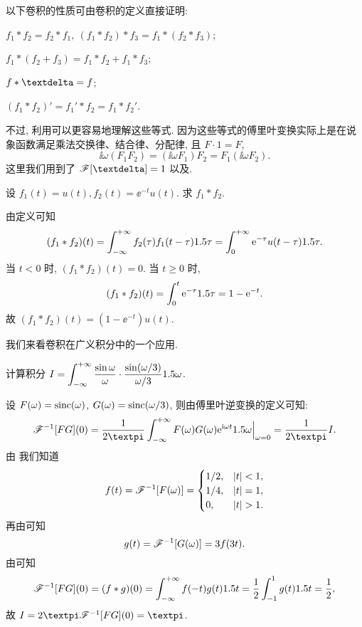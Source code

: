 以下卷积的性质可由卷积的定义直接证明:
\begin{enuma}
  \item $f_1\ast f_2=f_2\ast f_1,\ (f_1\ast f_2)\ast f_3=f_1\ast(f_2\ast f_3)$;
  \item $f_1\ast(f_2+f_3)=f_1\ast f_2+f_1\ast f_3$;
  \item $f\ast\dirac=f$;
  \item $(f_1\ast f_2)'=f_1'\ast f_2=f_1\ast f_2'$.
\end{enuma}
不过, 利用\thmFConv 可以更容易地理解这些等式.
因为这些等式的傅里叶变换实际上是在说象函数满足乘法交换律、结合律、分配律, 且 $F\cdot 1=F$,
\[
  \ii\omega (F_1F_2)=(\ii\omega F_1)F_2
  =F_1(\ii\omega F_2).
\]
这里我们用到了 $\msf[\dirac]=1$ 以及\thmFDif.

\begin{example}
  设 $f_1(t)=u(t),f_2(t)=\ee^{-t}u(t)$. 求 $f_1\ast f_2$.
\end{example}

\begin{solution}
  由定义可知
  \[
     (f_1\ast f_2)(t)
    =\displaystyle\int_{-\infty}^{+\infty} f_2(\tau)f_1(t-\tau)1.5 \tau
    =\displaystyle\int_0^{+\infty} \mathrm{e}^{-\tau}u(t-\tau)1.5 \tau.
  \]
  当 $t<0$ 时, $(f_1\ast f_2)(t)=0$.
  当 $t\ge0$ 时, 
  \[
     (f_1\ast f_2)(t)
    =\int_0^t \mathrm{e}^{-\tau}1.5 \tau
    =1-\mathrm{e}^{-t}.
  \]
  故 $(f_1\ast f_2)(t)=(1-\ee^{-t})u(t)$.
\end{solution}

我们来看卷积在广义积分中的一个应用.

\begin{example}
  \label{exam:bouwein-integral}
  计算积分 $I=\displaystyle\int_{-\infty}^{+\infty} \frac{\sin \omega}{\omega}\cdot \frac{\sin (\omega/3)}{\omega/3}1.5\omega$.
\end{example}

\begin{solution}
  设 $F(\omega)=\operatorname{sinc}(\omega)$, $G(\omega)=\operatorname{sinc}(\omega/3)$, 则由傅里叶逆变换的定义可知:
  \[
     \msf^{-1}[FG](0)
    =\frac1{2\cpi}\intff F(\omega)G(\omega)\ee^{\ii \omega t}\d\omega\Big|_{\omega=0}
    =\frac1{2\cpi}I.
  \]
  由 我们知道
  \[
    f(t)=\mathscr{F}^{-1}[F(\omega)]=\begin{cases}
      1/2, & \lvert t\rvert<1,\\
      1/4, & \lvert t\rvert=1,\\
      0, & \lvert t\rvert>1.
    \end{cases}
  \]
  再由\thmFSim 可知
  \[
    g(t)=\mathscr{F}^{-1}[G(\omega)]=3f(3t).
  \]
  由\thmFConv 可知
  \[
     \mathscr{F}^{-1}[FG](0)
    =(f\ast g)(0)
    =\displaystyle\int_{-\infty}^{+\infty} f(-t)g(t)1.5 t
    =\frac{1}{2}\int_{-1}^1 g(t)1.5 t
    =\frac{1}{2},
  \]
  故 $I=2\cpi\msf^{-1}[FG](0)=\cpi$.
\end{solution}

